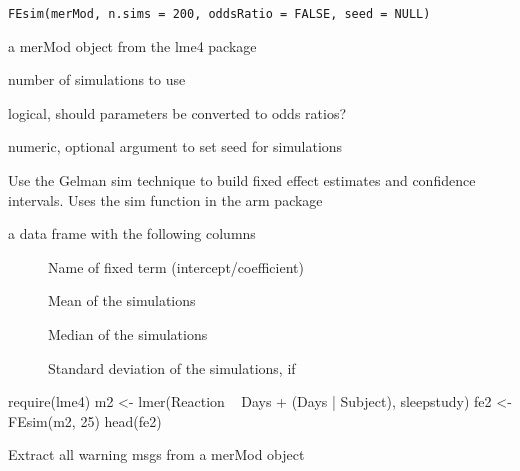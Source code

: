 \documentclass[letterpaper]{book}
\begin{document}
%
\begin{Usage}
\begin{verbatim}
FEsim(merMod, n.sims = 200, oddsRatio = FALSE, seed = NULL)
\end{verbatim}
\end{Usage}
%
\begin{Arguments}
\begin{ldescription}
\item[\code{merMod}] a merMod object from the lme4 package

\item[\code{n.sims}] number of simulations to use

\item[\code{oddsRatio}] logical, should parameters be converted to odds ratios?

\item[\code{seed}] numeric, optional argument to set seed for simulations
\end{ldescription}
\end{Arguments}
%
\begin{Details}\relax
Use the Gelman sim technique to build fixed effect estimates and
confidence intervals. Uses the sim function in the arm package
\end{Details}
%
\begin{Value}
a data frame with the following columns
\begin{description}

\item[] Name of fixed term (intercept/coefficient)
\item[] Mean of the simulations
\item[] Median of the simulations
\item[] Standard deviation of the simulations,  if 

\end{description}

\end{Value}
%
\begin{Examples}
\begin{ExampleCode}
require(lme4)
m2 <- lmer(Reaction ~ Days + (Days | Subject), sleepstudy)
fe2 <- FEsim(m2, 25)
head(fe2)
\end{ExampleCode}
\end{Examples}
%
\begin{Description}\relax
Extract all warning msgs from a merMod object
\end{Description}
\end{document}
